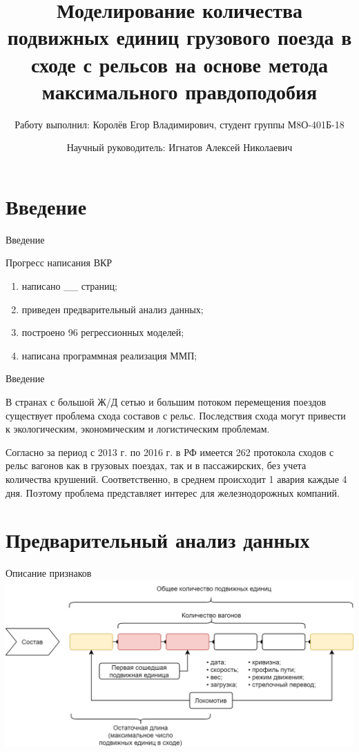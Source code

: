\documentclass[aspectratio=169]{beamer}
\title[Моделирование количества сошедших вагонов]{Моделирование количества подвижных единиц грузового поезда в сходе с рельсов на основе метода максимального правдоподобия}
\author[Е.В.Королёв \and А.Н.Игнатов]{Работу выполнил: Королёв Егор Владимирович, студент группы М8О-401Б-18 \and Научный руководитель: Игнатов Алексей Николаевич}
\institute[НИУ МАИ]{Московский авиационный институт (НИУ)}
\begin{document}
    \begin{frame}
        \maketitle
    \end{frame}


    \section{Введение}
    \begin{frame}{Введение}
        \begin{block}{Прогресс написания ВКР}
            \begin{enumerate}
                \item написано \_\_ страниц;
                \item приведен предварительный анализ данных;
                \item построено 96 регрессионных моделей;
                \item написана программная реализация ММП;
            \end{enumerate}
        \end{block}
    \end{frame}

    
    \begin{frame}{Введение}
        \begin{block}{}
            В странах с большой Ж/Д сетью и большим потоком перемещения поездов существует проблема схода составов с рельс. Последствия схода могут привести к экологическим, экономическим и логистическим проблемам.
        \end{block}
    
        \begin{block}{}
            Согласно \cite{Ignatov:functional_dependence} за период с 2013 г. по 2016 г. в РФ имеется 262 протокола сходов с рельс вагонов как в грузовых поездах, так и в пассажирских, без учета количества крушений. Соответственно, в среднем происходит 1 авария каждые 4 дня. Поэтому проблема представляет интерес для железнодорожных компаний.
        \end{block}
    \end{frame}


    \section{Предварительный анализ данных}
    \begin{frame}{Описание признаков}
        \centering
        \includegraphics[width=0.8\linewidth]{src/train.png}
    \end{frame}
\end{document}
